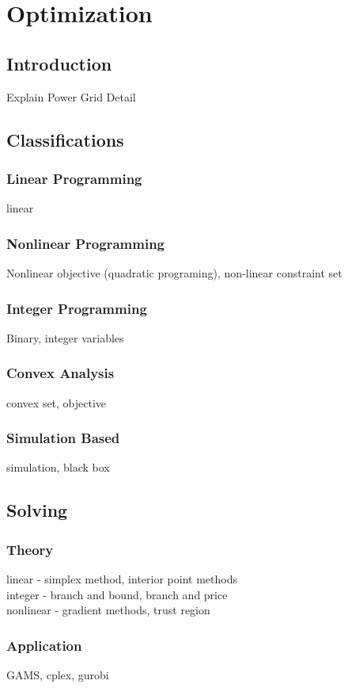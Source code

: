
\chapter{Optimization}




\section{Introduction}
Explain Power Grid Detail
\section{Classifications}
\subsection{Linear Programming}
linear 
\subsection{Nonlinear Programming}
Nonlinear objective (quadratic programing), non-linear constraint set
\subsection{Integer Programming}
Binary, integer variables
\subsection{Convex Analysis}
convex set, objective
\subsection{Simulation Based}
simulation, black box
\section{Solving}
\subsection{Theory}
linear - simplex method, interior point methods \\
integer - branch and bound, branch and price \\
nonlinear - gradient methods, trust region 
\subsection{Application}
GAMS, cplex, gurobi